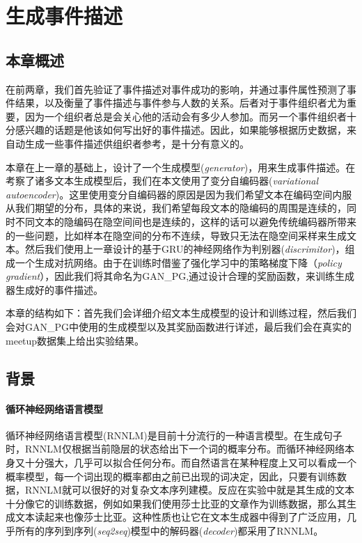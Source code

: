     
% 
\section{生成事件描述}

\subsection{本章概述}
在前两章，我们首先验证了事件描述对事件成功的影响，并通过事件属性预测了事件结果，以及衡量了事件描述与事件参与人数的关系。后者对于事件组织者尤为重要，因为一个组织者总是会关心他的活动会有多少人参加。而另一个事件组织者十分感兴趣的话题是他该如何写出好的事件描述。因此，如果能够根据历史数据，来自动生成一些事件描述供组织者参考，是十分有意义的。

本章在上一章的基础上，设计了一个生成模型(\textit{generator})，用来生成事件描述。在考察了诸多文本生成模型后，我们在本文使用了变分自编码器\cite{kingma_auto-encoding_2013,bowman_generating_2015}(\textit{variational autoencoder})。这里使用变分自编码器的原因是因为我们希望文本在编码空间内服从我们期望的分布，具体的来说，我们希望每段文本的隐编码的周围是连续的，同时不同文本的隐编码在隐空间间也是连续的，这样的话可以避免传统编码器所带来的一些问题，比如样本在隐空间的分布不连续，导致只无法在隐空间采样来生成文本。然后我们使用上一章设计的基于GRU的神经网络作为判别器(\textit{discrimitor})，组成一个生成对抗网络\cite{goodfellow_generative_2014}。由于在训练时借鉴了强化学习中的策略梯度下降（\textit{policy gradient}），因此我们将其命名为GAN\_PG,通过设计合理的奖励函数，来训练生成器生成好的事件描述。

本章的结构如下：首先我们会详细介绍文本生成模型的设计和训练过程，然后我们会对GAN\_PG中使用的生成模型以及其奖励函数进行详述，最后我们会在真实的meetup数据集上给出实验结果。

\subsection{背景}
\paragraph{循环神经网络语言模型}
循环神经网络语言模型(RNNLM\cite{mikolov_rnnlm_2011})是目前十分流行的一种语言模型。在生成句子时，RNNLM仅根据当前隐层的状态给出下一个词的概率分布。而循环神经网络本身又十分强大，几乎可以拟合任何分布。而自然语言在某种程度上又可以看成一个概率模型，每一个词出现的概率都由之前已出现的词决定，因此，只要有训练数据，RNNLM就可以很好的对复杂文本序列建模。反应在实验中就是其生成的文本十分像它的训练数据，例如如果我们使用莎士比亚的文章作为训练数据，那么其生成文本读起来也像莎士比亚。这种性质也让它在文本生成器中得到了广泛应用，几乎所有的序列到序列(\textit{seq2seq})模型中的解码器(\textit{decoder})都采用了RNNLM。
